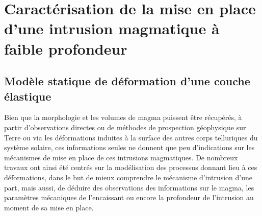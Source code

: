 \section{Caractérisation  de   la  mise  en  place   d'une  intrusion
  magmatique à faible profondeur}
\label{C1-sec:orign-theor-fram}

\subsection{Modèle statique de déformation d'une couche élastique}
\label{C1-sec:model-statique-de}

Bien  que  la  morphologie  et  les volumes  de  magma  puissent  être
récupérés,  à  partir  d'observations   directes  ou  de  méthodes  de
prospection géophysique sur  Terre ou via les  déformations induites à
la  surface  des autres  corps  telluriques  du système  solaire,  ces
informations  seules   ne  donnent  que  peu   d'indications  sur  les
mécanismes  de  mise  en  place de  ces  intrusions  magmatiques.   De
nombreux  travaux  ont  ainsi  été centrés  sur  la  modélisation  des
processus  donnant lieu  à  ces  déformations, dans  le  but de  mieux
comprendre le mécanisme d'intrusion d'une part, mais aussi, de déduire
des  observations  des  informations  sur  le  magma,  les  paramètres
mécaniques de l'encaissant  ou encore la profondeur  de l'intrusion au
moment de sa mise en place.

